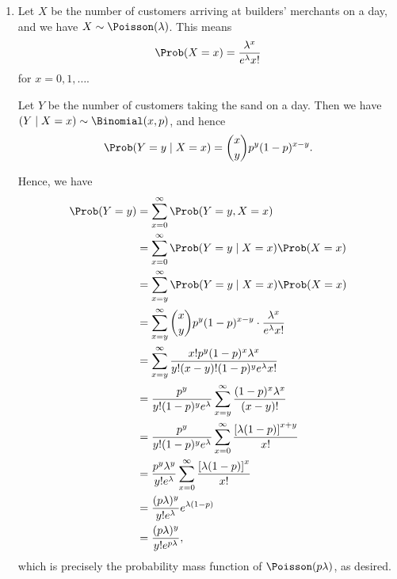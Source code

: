 \Question{\currfilebase}

\begin{enumerate}
    \item Let \(X\) be the number of customers arriving at builders' merchants on a day, and we have \(X \sim \Poisson(\lambda)\). This means
          \[
              \Prob(X = x) = \frac{\lambda^x}{e^\lambda x!}
          \]
          for \(x = 0, 1, \ldots\).

          Let \(Y\) be the number of customers taking the sand on a day. Then we have \(\left(Y \mid X = x\right) \sim \Binomial(x, p)\), and hence
          \[
              \Prob(Y = y \mid X = x) = \binom{x}{y} p^y (1 - p)^{x - y}.
          \]

          Hence, we have
          \begin{align*}
              \Prob(Y = y) & = \sum_{x = 0}^{\infty} \Prob(Y = y, X = x)                                                                \\
                           & = \sum_{x = 0}^{\infty} \Prob(Y = y \mid X = x) \Prob(X = x)                                               \\
                           & = \sum_{x = y}^{\infty} \Prob(Y = y \mid X = x) \Prob(X = x)                                               \\
                           & = \sum_{x = y}^{\infty} \binom{x}{y} p^y (1 - p)^{x - y} \cdot \frac{\lambda^x}{e^\lambda x!}              \\
                           & =  \sum_{x = y}^{\infty} \frac{x! p^y (1 - p)^x \lambda^x}{y! (x - y)! (1 - p)^y e^\lambda x!}             \\
                           & = \frac{p^y}{y! (1 - p)^y e^\lambda} \sum_{x = y}^{\infty} \frac{(1 - p)^x \lambda^x}{(x - y)!}            \\
                           & = \frac{p^y}{y! (1 - p)^y e^\lambda} \sum_{x = 0}^{\infty} \frac{\left[\lambda (1 - p)\right]^{x + y}}{x!} \\
                           & = \frac{p^y \lambda^y}{y! e^\lambda} \sum_{x = 0}^{\infty} \frac{\left[\lambda (1 - p)\right]^x}{x!}       \\
                           & = \frac{(p \lambda)^y}{y! e^\lambda} e^{\lambda (1 - p)}                                                   \\
                           & = \frac{(p \lambda)^y}{y! e^{p \lambda}},
          \end{align*}
          which is precisely the probability mass function of \(\Poisson(p \lambda)\), as desired.


\end{enumerate}
